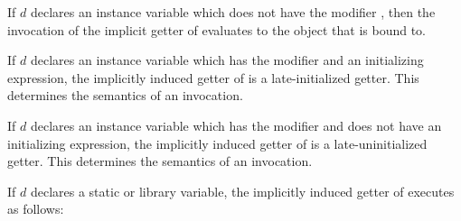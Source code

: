 \documentclass[makeidx]{article}
\begin{document}
\LMHash{}%
If $d$ declares an instance variable which does not have the modifier \LATE,
then the invocation of the implicit getter of \id{} evaluates to
the object that \id{} is bound to.

\EndCase

\LMHash{}%
If $d$ declares an instance variable \id{} which has the modifier \LATE{}
and an initializing expression,
the implicitly induced getter of \id{} is a
late-initialized getter.
This determines the semantics of an invocation.
\EndCase

\LMHash{}%
If $d$ declares an instance variable \id{} which has the modifier \LATE{}
and does not have an initializing expression,
the implicitly induced getter of \id{} is a
late-uninitialized getter.
This determines the semantics of an invocation.

\EndCase

\LMHash{}%
If $d$ declares a static or library variable,
the implicitly induced getter of \id{} executes as follows:
\end{document}
